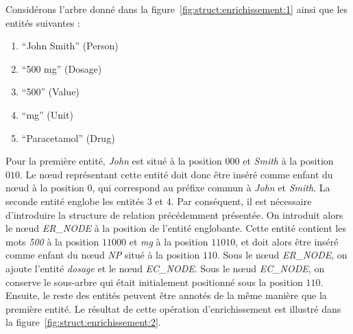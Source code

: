 \begin{example}
    Considérons l'arbre donné dans la figure~\ref{fig:struct:enrichissement:1} ainsi que les entités suivantes :
    \begin{multicols}{3}
        \begin{enumerate}
            \item \enquote{John Smith} (Person)
            \item \enquote{500 mg} (Dosage)
            \item \enquote{500} (Value)
            \item \enquote{mg} (Unit)
            \item \enquote{Paracetamol} (Drug)
        \end{enumerate}
    \end{multicols}

    Pour la première entité, \emph{John} est situé à la position $000$ et \emph{Smith} à la position $010$.
    Le nœud représentant cette entité doit donc être inséré comme enfant du nœud à la position $0$, qui correspond au préfixe commun à \emph{John} et \emph{Smith}.
    La seconde entité englobe les entités 3 et 4.
    Par conséquent, il est nécessaire d'introduire la structure de relation précédemment présentée.
    On introduit alors le nœud \emph{ER\_NODE} à la position de l'entité englobante.
    Cette entité contient les mots \emph{500} à la position $11000$ et \emph{mg} à la position $11010$, et doit alors être inséré comme enfant du nœud \emph{NP} situé à la position $110$.
    Sous le nœud \emph{ER\_NODE}, on ajoute l'entité \emph{dosage} et le nœud \emph{EC\_NODE}.
    Sous le nœud \emph{EC\_NODE}, on conserve le sous-arbre qui était initialement positionné sous la position $110$.
    Ensuite, le reste des entités peuvent être annotés de la même manière que la première entité.
    Le résultat de cette opération d'enrichissement est illustré dans la figure~\ref{fig:struct:enrichissement:2}.
\end{example}

